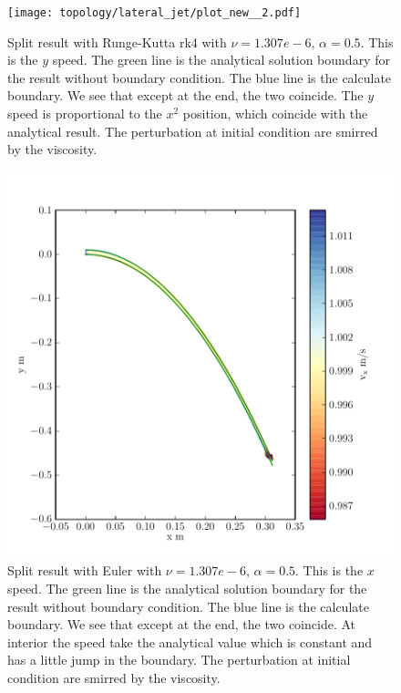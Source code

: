 \begin{figure}
	\texttt{[image: topology/lateral\_jet/plot\_new\_\_2.pdf]}
		\caption{Split result with Runge-Kutta rk4 with $\nu=1.307e-6$, $\alpha=0.5$.
	This is the $y$ speed.
	The green line is the analytical solution boundary for the result without boundary condition.
	The blue line is the calculate boundary.
	We see that except at the end, the two coincide.
	The $y$ speed is proportional to the $x^2$ position, which coincide with the analytical result.
	The perturbation at initial condition are smirred by the viscosity.}
	\label{topo:extrap:lateral:9_2}
\end{figure}


\begin{figure}
	\includegraphics{topology/lateral_jet/plot_10__1_293.pdf}
			\caption{Split result with Euler with $\nu=1.307e-6$, $\alpha=0.5$.
	This is the $x$ speed.
	The green line is the analytical solution boundary for the result without boundary condition.
	The blue line is the calculate boundary.
	We see that except at the end, the two coincide.
	At interior the speed take the analytical value which is constant and has a little jump in the boundary.
	The perturbation at initial condition are smirred by the viscosity.}
	\label{topo:extrap:lateral:10_1}
\end{figure}

